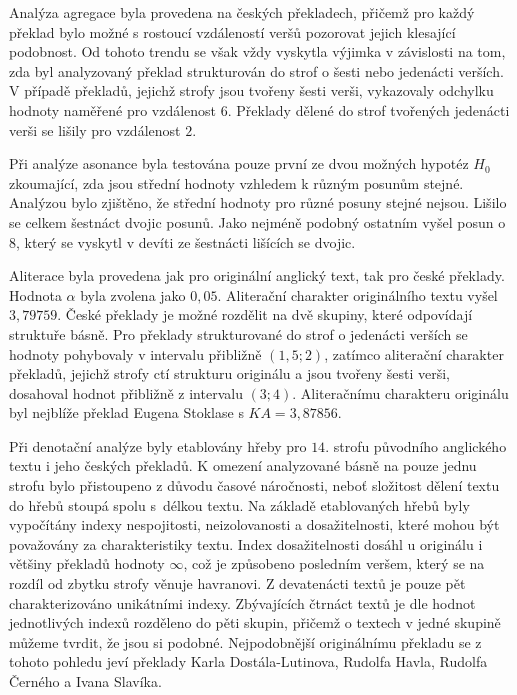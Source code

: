 \documentclass[dp.tex]{subfiles}
\begin{document}
Analýza agregace byla provedena na českých překladech, přičemž pro každý překlad bylo možné s rostoucí vzdáleností veršů pozorovat jejich klesající podobnost. Od tohoto trendu se však vždy vyskytla výjimka v závislosti na tom, zda byl analyzovaný překlad strukturován do strof o šesti nebo jedenácti verších. V případě překladů, jejichž strofy jsou tvořeny šesti verši, vykazovaly odchylku hodnoty naměřené pro vzdálenost $6$. Překlady dělené do strof tvořených jedenácti verši se lišily pro vzdálenost $2$.

Při analýze asonance byla testována pouze první ze dvou možných hypotéz $H_0$ zkoumající, zda jsou střední hodnoty vzhledem k různým posunům stejné. Analýzou bylo zjištěno, že střední hodnoty pro různé posuny stejné nejsou. Lišilo se celkem šestnáct dvojic posunů. Jako nejméně podobný ostatním vyšel posun o $8$, který se vyskytl v devíti ze šestnácti lišících se dvojic.

Aliterace byla provedena jak pro originální anglický text, tak pro české překlady. Hodnota $\alpha$ byla zvolena jako $0{,}05$. Aliterační charakter \KA originálního textu vyšel $3{,}79759$. České překlady je možné rozdělit na dvě skupiny, které odpovídají struktuře básně. Pro překlady strukturované do strof o jedenácti verších se hodnoty \KA pohybovaly v intervalu přibližně $( 1{,}5;2 )$, zatímco aliterační charakter překladů, jejichž strofy ctí strukturu originálu a jsou tvořeny šesti verši, dosahoval hodnot přibližně z intervalu $\left( 3; 4 \right)$. Aliteračnímu charakteru originálu byl nejblíže překlad Eugena Stoklase s ${K\!A} = 3{,}87856$.

Při denotační analýze byly etablovány hřeby pro $14.$ strofu původního  anglického textu i jeho českých překladů. K omezení analyzované básně na pouze jednu strofu bylo přistoupeno z důvodu časové náročnosti, neboť složitost dělení textu do hřebů stoupá spolu s~délkou textu. Na základě etablovaných hřebů byly vypočítány indexy nespojitosti, neizolovanosti a dosažitelnosti, které mohou být považovány za charakteristiky textu. Index dosažitelnosti dosáhl u originálu i většiny překladů hodnoty $\infty$, což je způsobeno posledním veršem, který se na rozdíl od zbytku strofy věnuje havranovi. Z devatenácti textů je pouze pět charakterizováno unikátními indexy. Zbývajících čtrnáct textů je dle hodnot jednotlivých indexů rozděleno do pěti skupin, přičemž o textech v jedné skupině můžeme tvrdit, že jsou si podobné. Nejpodobnější originálnímu překladu se z tohoto pohledu jeví překlady Karla Dostála-Lutinova, Rudolfa Havla, Rudolfa Černého a Ivana Slavíka.
\end{document}
